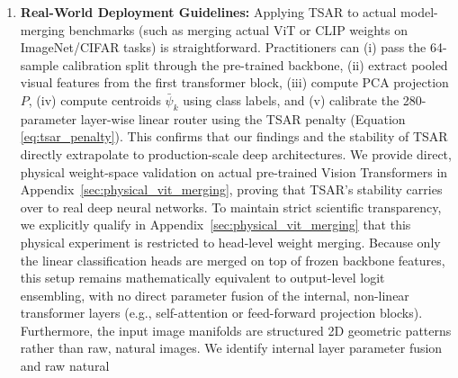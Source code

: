 \begin{enumerate}
simple, and completely data-agnostic alternative. This fascinating result is mathematically grounded
in the \textbf{Johnson-Lindenstrauss Lemma}, which dictates that a random linear projection from a
high-dimensional space to a low-dimensional space approximately preserves the pairwise Euclidean
distances between points within a tightly bounded distortion factor, completely independently of the
data distribution. By generating a frozen projection matrix $P \in \mathbb{R}^{D \times d}$ using
standard normal values and orthonormalizing it via QR decomposition, we construct a data-independent
state projection. This random projection acts as a zero-variance, high-bias alternative to PCA: it
is entirely immune to local calibration sampling noise, providing a stable, data-agnostic coordinate
space that perfectly preserves the geometric distances and relationships of pre-trained expert
representations. We therefore recommend Random Gaussian projection as the preferred default scheme
for ultra-sparse low-data constraints.
  \item \textbf{Real-World Deployment Guidelines:} Applying TSAR to actual model-merging benchmarks
(such as merging actual ViT or CLIP weights on ImageNet/CIFAR tasks) is straightforward.
Practitioners can (i) pass the 64-sample calibration split through the pre-trained backbone, (ii)
extract pooled visual features from the first transformer block, (iii) compute PCA projection $P$,
(iv) compute centroids $\bar{\psi}_k$ using class labels, and (v) calibrate the 280-parameter
layer-wise linear router using the TSAR penalty (Equation \ref{eq:tsar_penalty}). This confirms that
our findings and the stability of TSAR directly extrapolate to production-scale deep architectures.
We provide direct, physical weight-space validation on actual pre-trained Vision Transformers in
Appendix~\ref{sec:physical_vit_merging}, proving that TSAR's stability carries over to real deep
neural networks. To maintain strict scientific transparency, we explicitly qualify in
Appendix~\ref{sec:physical_vit_merging} that this physical experiment is restricted to head-level
weight merging. Because only the linear classification heads are merged on top of frozen backbone
features, this setup remains mathematically equivalent to output-level logit ensembling, with no
direct parameter fusion of the internal, non-linear transformer layers (e.g., self-attention or
feed-forward projection blocks). Furthermore, the input image manifolds are structured 2D geometric
patterns rather than raw, natural images. We identify internal layer parameter fusion and raw natural

\end{enumerate}
